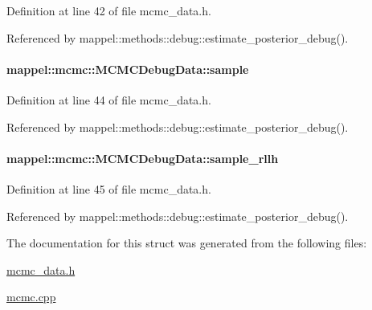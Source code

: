 Definition at line 42 of file mcmc\+\_\+data.\+h.



Referenced by mappel\+::methods\+::debug\+::estimate\+\_\+posterior\+\_\+debug().

\paragraph[{\texorpdfstring{sample}{sample}}]{ mappel\+::mcmc\+::\+M\+C\+M\+C\+Debug\+Data\+::sample}\hypertarget{structmappel_1_1mcmc_1_1MCMCDebugData_ad6dd0a8a4ee0b8a532e0c041b8cde1d9}{}\label{structmappel_1_1mcmc_1_1MCMCDebugData_ad6dd0a8a4ee0b8a532e0c041b8cde1d9}


Definition at line 44 of file mcmc\+\_\+data.\+h.



Referenced by mappel\+::methods\+::debug\+::estimate\+\_\+posterior\+\_\+debug().

\paragraph[{\texorpdfstring{sample\+\_\+rllh}{sample_rllh}}]{ mappel\+::mcmc\+::\+M\+C\+M\+C\+Debug\+Data\+::sample\+\_\+rllh}\hypertarget{structmappel_1_1mcmc_1_1MCMCDebugData_a02b5c1388b6fa43c9aee01c63cda8111}{}\label{structmappel_1_1mcmc_1_1MCMCDebugData_a02b5c1388b6fa43c9aee01c63cda8111}


Definition at line 45 of file mcmc\+\_\+data.\+h.



Referenced by mappel\+::methods\+::debug\+::estimate\+\_\+posterior\+\_\+debug().



The documentation for this struct was generated from the following files\+:\begin{DoxyCompactItemize}
\item 
\hyperlink{mcmc__data_8h}{mcmc\+\_\+data.\+h}\item 
\hyperlink{mcmc_8cpp}{mcmc.\+cpp}\end{DoxyCompactItemize}
